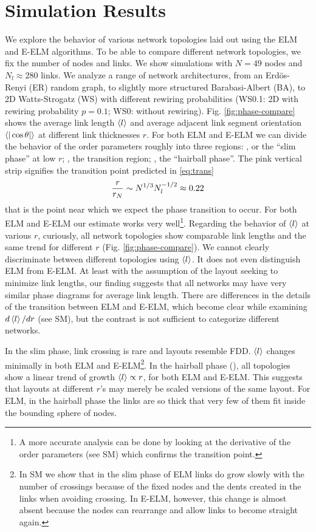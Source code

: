 \documentclass[nofootinbib,preprint,endfloats]{revtex4} %
\newcommand{\RNum}[1]{\uppercase\expandafter{\romannumeral #1\relax}}
\begin{document}
\section{Simulation Results}
We explore the behavior of various network topologies laid out using the ELM and E-ELM algorithms. 
To be able to compare different network topologies, we fix the number of nodes and links. We show simulations with $N=49$ nodes and $N_l\approx 280$ links. 
We analyze a range of network architectures, from an Erd\"os-Renyi (ER) random graph, to slightly more structured Barabasi-Albert (BA), to 2D Watts-Strogatz (WS) with different rewiring probabilities (WS0.1: 2D with rewiring probability $p=0.1$; WS0: without rewiring). Fig. \ref{fig:phase-compare} shows the average link length $\left<l\right>$ and average adjacent link segment orientation $\be{|\cos\theta|}$ at different link thicknesses $r$. For both ELM and E-ELM we can divide the behavior of the order parameters roughly into three regions: \RNum{1}, or the ``slim phase'' at low $r$; \RNum{2}, the transition region; \RNum{3}, the ``hairball phase''. The pink vertical strip signifies the transition point predicted in \eqref{eq:trans} 
\[{r\over r_N} \sim N^{1/3} N_l^{-1/2}\approx 0.22\]
that is the point near which we expect the phase transition to occur. 
For both ELM and E-ELM our estimate works very well\footnote{A more accurate analysis can be done by looking at the derivative of the order parameters (see SM) which confirms the transition point.}. 
Regarding the behavior of $\left<l\right>$ at various $r$, curiously, all network topologies show comparable link lengths and the same trend for different $r$ (Fig. \ref{fig:phase-compare}).
We cannot clearly discriminate between different topologies using $\left<l\right>$. 
It does not even distinguish ELM from E-ELM. 
At least with the assumption of the layout seeking to minimize link lengths, our finding suggests that all networks may have very similar phase diagrams for average link length. 
There are differences in the details of the transition between ELM and E-ELM, which become clear while examining $ d\left<l\right>/dr$ (see SM), but the contrast is not sufficient to categorize different networks. 

In the slim phase, link crossing is rare and layouts resemble FDD.
$\left<l\right>$ changes minimally in both ELM and E-ELM\footnote{
In SM we show that in the slim phase of ELM links do grow slowly with the number of crossings because of the fixed nodes and the dents created in the links when avoiding crossing. 
In E-ELM, however, this change is almost absent because the nodes can rearrange and allow links to become straight again.}. 
In the hairball phase (\RNum{3}), all topologies show a linear trend of growth $\left<l\right> \propto r$, for both ELM and E-ELM.
This suggests that layouts at different $r$'s may merely be scaled versions of the same layout.
For ELM, %
in the hairball phase the links are so thick that very few of them fit inside the bounding sphere of nodes. 
\end{document}
